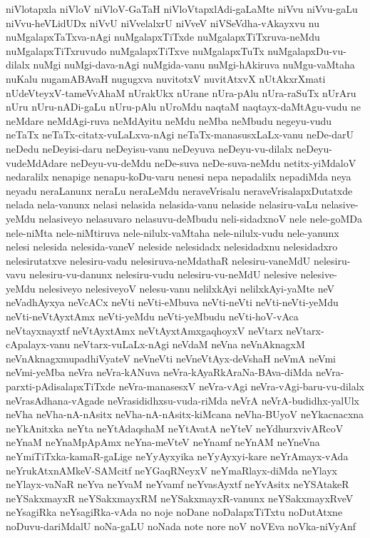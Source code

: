 {niVlotapxla
niVloV
niVloV-GaTaH
niVloVtapxlAdi-gaLaMte
niVvu
niVvu-gaLu
niVvu-heVLidUDx
niVvU
niVvelalxrU
niVveV
niVSeVdha-vAkayxvu
nu
nuMgalapxTaTxva-nAgi
nuMgalapxTiTxde
nuMgalapxTiTxruva-neMdu
nuMgalapxTiTxruvudo
nuMgalapxTiTxve
nuMgalapxTuTx
nuMgalapxDu-vu-dilalx
nuMgi
nuMgi-dava-nAgi
nuMgida-vanu
nuMgi-hAkiruva
nuMgu-vaMtaha
nuKalu
nugamABAvaH
nugugxva
nuvitotxV
nuvitAtxvX
nUtAkxrXmati
nUdeVteyxV-tameVvAhaM
nUrakUkx
nUrane
nUra-pAlu
nUra-raSuTx
nUrAru
nUru
nUru-nADi-gaLu
nUru-pAlu
nUroMdu
naqtaM
naqtayx-daMtAgu-vudu
ne
neMdare
neMdAgi-ruva
neMdAyitu
neMdu
neMba
neMbudu
negeyu-vudu
neTaTx
neTaTx-citatx-vuLaLxva-nAgi
neTaTx-manasusxLaLx-vanu
neDe-darU
neDedu
neDeyisi-daru
neDeyisu-vanu
neDeyuva
neDeyu-vu-dilalx
neDeyu-vudeMdAdare
neDeyu-vu-deMdu
neDe-suva
neDe-suva-neMdu
netitx-yiMdaloV
nedaralilx
nenapige
nenapu-koDu-varu
nenesi
nepa
nepadalilx
nepadiMda
neya
neyadu
neraLanunx
neraLu
neraLeMdu
neraveVrisalu
neraveVrisalapxDutatxde
nelada
nela-vanunx
nelasi
nelasida
nelasida-vanu
nelaside
nelasiru-vaLu
nelasive-yeMdu
nelasiveyo
nelasuvaro
nelasuvu-deMbudu
neli-sidadxnoV
nele
nele-goMDa
nele-niMta
nele-niMtiruva
nele-nilulx-vaMtaha
nele-nilulx-vudu
nele-yanunx
nelesi
nelesida
nelesida-vaneV
neleside
nelesidadx
nelesidadxnu
nelesidadxro
nelesirutatxve
nelesiru-vadu
nelesiruva-neMdathaR
nelesiru-vaneMdU
nelesiru-vavu
nelesiru-vu-danunx
nelesiru-vudu
nelesiru-vu-neMdU
nelesive
nelesive-yeMdu
nelesiveyo
nelesiveyoV
nelesu-vanu
nelilxkAyi
nelilxkAyi-yaMte
neV
neVadhAyxya
neVcACx
neVti
neVti-eMbuva
neVti-neVti
neVti-neVti-yeMdu
neVti-neVtAyxtAmx
neVti-yeMdu
neVti-yeMbudu
neVti-hoV-vAca
neVtayxnayxtf
neVtAyxtAmx
neVtAyxtAmxgaqhoyxV
neVtarx
neVtarx-cApalayx-vanu
neVtarx-vuLaLx-nAgi
neVdaM
neVna
neVnAknagxM
neVnAknagxmupadhiVyateV
neVneVti
neVneVtAyx-deVshaH
neVmA
neVmi
neVmi-yeMba
neVra
neVra-kANuva
neVra-kAyaRkAraNa-BAva-diMda
neVra-parxti-pAdisalapxTiTxde
neVra-manasesxV
neVra-vAgi
neVra-vAgi-baru-vu-dilalx
neVrasAdhana-vAgade
neVrasididhxsu-vuda-riMda
neVrA
neVrA-budidhx-yalUlx
neVha
neVha-nA-nAsitx
neVha-nA-nAsitx-kiMcana
neVha-BUyoV
neYkacnacxna
neYkAnitxka
neYta
neYtAdaqshaM
neYtAvatA
neYteV
neYdhurxvivARcoV
neYnaM
neYnaMpApAmx
neYna-meVteV
neYnamf
neYnAM
neYneVna
neYmiTiTxka-kamaR-gaLige
neYyAyxyika
neYyAyxyi-kare
neYrAmayx-vAda
neYrukAtxnAMkeV-SAMcitf
neYGaqRNeyxV
neYmaRlayx-diMda
neYlayx
neYlayx-vaNaR
neYva
neYvaM
neYvamf
neYvasAyxtf
neYvAsitx
neYSAtakeR
neYSakxmayxR
neYSakxmayxRM
neYSakxmayxR-vanunx
neYSakxmayxRveV
neYsagiRka
neYsagiRka-vAda
no
noje
noDane
noDalapxTiTxtu
noDutAtxne
noDuvu-dariMdalU
noNa-gaLU
noNada
note
nore
noV
noVEva
noVka-niVyAnf
}
